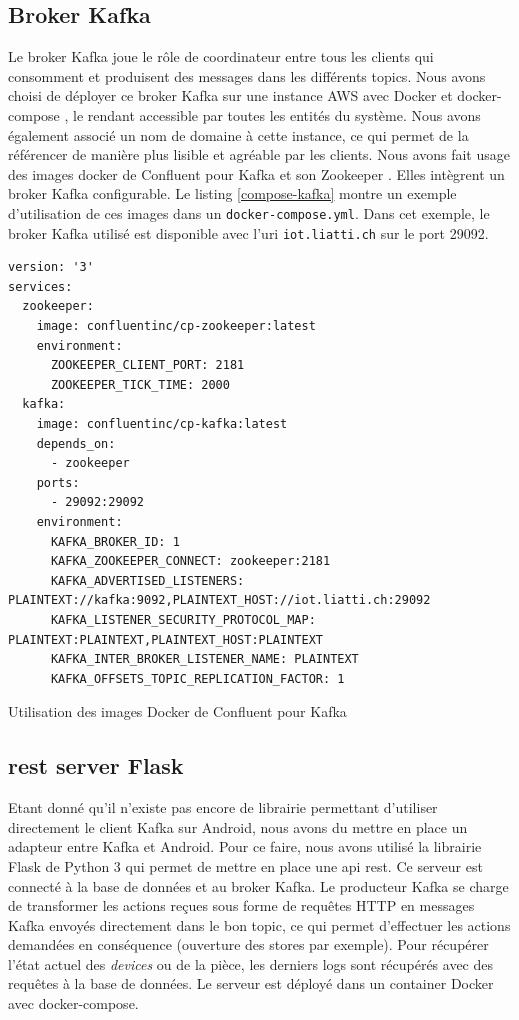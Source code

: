 \subsection{Broker Kafka}
Le broker Kafka joue le rôle de coordinateur entre tous les clients qui consomment et produisent des messages dans les différents topics. Nous avons choisi de déployer ce broker Kafka sur une instance AWS \cite{aws} avec Docker \cite{docker} et docker-compose \cite{docker-compose}, le rendant accessible par toutes les entités du système.
Nous avons également associé un nom de domaine à cette instance, ce qui permet de la référencer de manière plus lisible et agréable par les clients. Nous avons fait usage des images docker de Confluent \cite{confluent} pour Kafka \cite{cp-kafka} et son Zookeeper \cite{cp-zookeeper}. Elles intègrent un broker Kafka configurable. Le listing \ref{compose-kafka} montre un exemple d'utilisation de ces images dans un \texttt{docker-compose.yml}. Dans cet exemple, le broker Kafka utilisé est disponible avec l'\acrshort{uri} \texttt{iot.liatti.ch} sur le port 29092.
\begin{code}
    \begin{verbatim}
version: '3'
services:
  zookeeper:
    image: confluentinc/cp-zookeeper:latest
    environment:
      ZOOKEEPER_CLIENT_PORT: 2181
      ZOOKEEPER_TICK_TIME: 2000
  kafka:
    image: confluentinc/cp-kafka:latest
    depends_on:
      - zookeeper
    ports:
      - 29092:29092
    environment:
      KAFKA_BROKER_ID: 1
      KAFKA_ZOOKEEPER_CONNECT: zookeeper:2181
      KAFKA_ADVERTISED_LISTENERS: PLAINTEXT://kafka:9092,PLAINTEXT_HOST://iot.liatti.ch:29092
      KAFKA_LISTENER_SECURITY_PROTOCOL_MAP: PLAINTEXT:PLAINTEXT,PLAINTEXT_HOST:PLAINTEXT
      KAFKA_INTER_BROKER_LISTENER_NAME: PLAINTEXT
      KAFKA_OFFSETS_TOPIC_REPLICATION_FACTOR: 1
    \end{verbatim}
    \caption{Utilisation des images Docker de Confluent pour Kafka}
    \label{compose-kafka}
\end{code}

\subsection{\acrshort{rest} server Flask}
Etant donné qu'il n'existe pas encore de librairie permettant d'utiliser directement le client Kafka sur Android, nous avons du mettre en place un adapteur entre Kafka et Android.
Pour ce faire, nous avons utilisé la librairie Flask \cite{flask} de Python 3 qui permet de mettre en place une \acrshort{api} \acrshort{rest}. Ce serveur est connecté à la base de données et au broker Kafka. Le producteur Kafka se charge de transformer les actions reçues sous forme de requêtes HTTP en messages Kafka envoyés directement dans le bon topic, ce qui permet d'effectuer les actions demandées en conséquence (ouverture des stores par exemple). Pour récupérer l'état actuel des \textit{\textit{devices}} ou de la pièce, les derniers logs sont récupérés avec des requêtes à la base de données. Le serveur est déployé dans un container Docker avec docker-compose.

